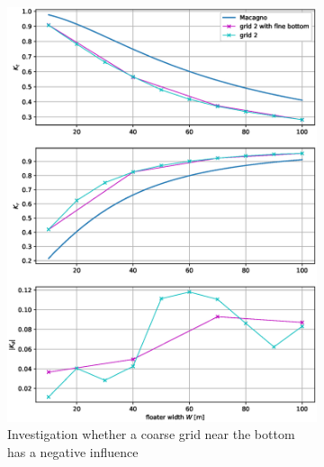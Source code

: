 \begin{figure}[H]
    \centering
    \begin{subfigure}[b]{0.49\textwidth}
        \centering
        \includegraphics[width=\textwidth]{figures/Validation/magagno_investigation_fine_bottom.eps}
        \caption[]%
        {{\small}Investigation whether a coarse grid near the bottom has a negative influence}    
        \label{fig:check coarse bottom}
    \end{subfigure}
    \hfill
    \begin{subfigure}[b]{0.49\textwidth}  
        \centering 

\end{subfigure}
\end{figure}

